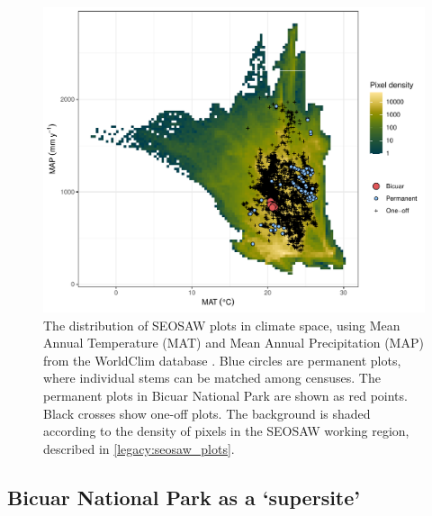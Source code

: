 \begin{refsection}
\begin{figure}
	\includegraphics[width=0.8\linewidth]{img/seosaw_clim}
	\caption[Climatic distribution of plots in the SEOSAW network]{The distribution of SEOSAW plots in climate space, using Mean Annual Temperature (MAT) and Mean Annual Precipitation (MAP) from the WorldClim database \citep{Fick2017}. Blue circles are permanent plots, where individual stems can be matched among censuses. The permanent plots in Bicuar National Park are shown as red points. Black crosses show one-off plots. The background is shaded according to the density of pixels in the SEOSAW working region, described in \autoref{legacy:seosaw_plots}.}
	\label{legacy:seosaw_clim}
\end{figure}

\subsection{Bicuar National Park as a `supersite'}
\label{legacy:ssec:supersite}


\end{refsection}
